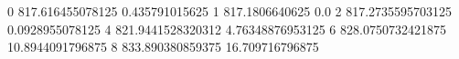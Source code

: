 0 817.616455078125 0.435791015625
1 817.1806640625 0.0
2 817.2735595703125 0.0928955078125
4 821.9441528320312 4.76348876953125
6 828.0750732421875 10.8944091796875
8 833.890380859375 16.709716796875
